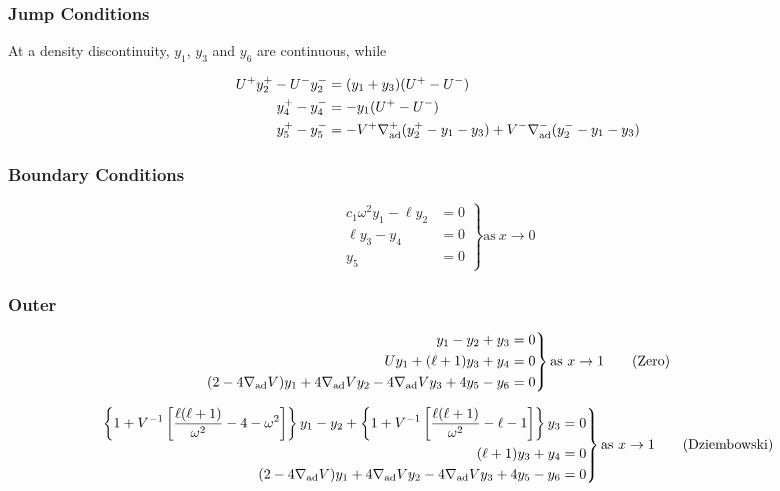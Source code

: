 \documentclass[fleqn]{article}
\newcommand{\nabad}{\ensuremath{\nabla_{\rm ad}}}
\begin{document}
\subsubsection*{Jump Conditions}

At a density discontinuity, $y_{1}$, $y_{3}$ and $y_{6}$ are
continuous, while

\begin{align*}
U^{+} y_{2}^{+} - U^{-} y_{2}^{-} &= (y_{1} + y_{3}) (U^{+} - U^{-}) \\
y_{4}^{+} - y_{4}^{-} &= -y_{1} (U^{+} - U^{-}) \\
y_{5}^{+} - y_{5}^{-} &= - V^{+} \nabad^{+} (y_{2}^{+} - y_{1} - y_{3}) +
V^{-} \nabad^{-} (y_{2}^{-} - y_{1} - y_{3}) \\
\end{align*}

\subsubsection*{Boundary Conditions}

\begin{equation*}
\left.
\begin{aligned}
c_{1} \omega^{2} y_{1} - \ell y_{2} &= 0 \\
\ell y_{3} - y_{4} &= 0 \\
y_{5} &= 0
\end{aligned}
\right\}
\text{as}\ x \rightarrow 0
\end{equation*}

\subsubsection*{Outer}

\begin{equation*}
\left.
\begin{aligned}
y_{1} - y_{2} + y_{3} &= 0 \\
U y_{1} + (\ell + 1) y_{3} + y_{4} &= 0 \\
(2 - 4\nabad V) y_{1} + 4 \nabad V y_{2} - 4 \nabad V y_{3} + 4 y_{5} - y_{6} &= 0
\end{aligned}
\right\}
\text{as}\ x \rightarrow 1 \qquad \text{(Zero)}
\end{equation*}

\begin{equation*}
\left.
\begin{aligned}
\left\{ 1 + V^{-1} \left[ \frac{\ell(\ell+1)}{\omega^{2}} - 4 - \omega^{2} \right] \right\} y_{1} -
y_{2} +
\left\{ 1 + V^{-1} \left[ \frac{\ell(\ell+1)}{\omega^{2}} - \ell - 1 \right] \right\} y_{3} &= 0 \\
(\ell + 1) y_{3} + y_{4} &= 0 \\
(2 - 4\nabad V) y_{1} + 4 \nabad V y_{2} - 4 \nabad V y_{3} + 4 y_{5} - y_{6} &= 0
\end{aligned}
\right\}
\text{as}\ x \rightarrow 1 \qquad \text{(Dziembowski)}
\end{equation*}
\end{document}
